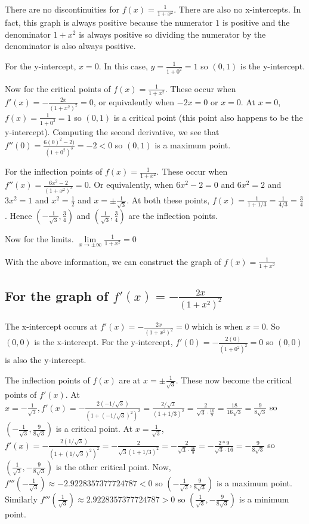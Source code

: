 \documentclass[9pt]{article}
\begin{document}
There are no discontinuities for $f(x) = \frac{1}{1 + x^2}$. There are also no x-intercepts. In fact, this graph is always positive because the numerator $1$ is positive and the denominator $1 + x^2$ is always positive so dividing the numerator by the denominator is also always positive.

For the y-intercept, $x = 0$. In this case, $y = \frac{1}{1 + 0^2} = 1$ so $(0, 1)$ is the y-intercept.

Now for the critical points of $f(x) = \frac{1}{1 + x^2}$. These occur when $f'(x) = -\frac{2x}{(1 + x^2)^2} = 0$, or equivalently when $-2x = 0$ or $x = 0$. At $x = 0$, $f(x) = \frac{1}{1 + 0^2} = 1$ so $(0, 1)$ is a critical point (this point also happens to be the y-intercept). Computing the second derivative, we see that $f''(0) = \frac{6(0)^2 - 2)}{(1 + 0^2)^3} = -2 < 0$ so $(0, 1)$ is a maximum point.

For the inflection points of $f(x) = \frac{1}{1 + x^2}$. These occur when $f''(x) = \frac{6x^2 - 2}{(1 + x^2)^3} = 0$. Or equivalently, when $6x^2 - 2 = 0$ and $6x^2 = 2$ and $3x^2 = 1$ and $x^2 = \frac{1}{2}$ and $x = \pm \frac{1}{\sqrt{3}}$. At both these points, $f(x) = \frac{1}{1 + 1/3} = \frac{1}{4/3} = \frac{3}{4}$. Hence $(-\frac{1}{\sqrt{3}}, \frac{3}{4})$ and $(\frac{1}{\sqrt{3}}, \frac{3}{4})$ are the inflection points.

Now for the limits. $\lim\limits_{x \rightarrow \pm\infty} \frac{1}{1 + x^2} = 0$

With the above information, we can construct the graph of $f(x) = \frac{1}{1 + x^2}$

\subsection*{For the graph of $f'(x) = -\frac{2x}{(1 + x^2)^2}$}

The x-intercept occurs at $f'(x) = -\frac{2x}{(1 + x^2)^2} = 0$ which is when $x = 0$. So $(0, 0)$ is the x-intercept. For the y-intercept, $f'(0) = -\frac{2(0)}{(1 + 0^2)^2} = 0$ so $(0, 0)$ is also the y-intercept.

The inflection points of $f(x)$ are at $x = \pm\frac{1}{\sqrt{3}}$. These now become the critical points of $f'(x)$. At $x = -\frac{1}{\sqrt{3}}, f'(x) = -\frac{2 (- 1 / \sqrt{3})}{(1 + (- 1 / \sqrt{3})^2)^2} = \frac{2 / \sqrt{3}}{(1 + 1/3)^2} = \frac{2}{\sqrt{3} \cdot \frac{16}{9}} = \frac{18}{16 \sqrt{3}} = \frac{9}{8 \sqrt{3}}$ so $(-\frac{1}{\sqrt{3}}, \frac{9}{8 \sqrt{3}})$ is a critical point. At $x = \frac{1}{\sqrt{3}}$, $f'(x) = -\frac{2 (1 / \sqrt{3})}{(1 + (1 / \sqrt{3})^2)^2} = -\frac{2}{\sqrt{3} (1 + 1/3)^2} = -\frac{2}{\sqrt{3} \cdot \frac{16}{9}} = -\frac{2 * 9}{\sqrt{3} \cdot 16} = -\frac{9}{8 \sqrt{3}}$ so $(\frac{1}{\sqrt{3}}, -\frac{9}{8 \sqrt{3}})$ is the other critical point. Now, $f'''(-\frac{1}{\sqrt{3}}) \approx -2.9228357377724787 < 0$ so $(-\frac{1}{\sqrt{3}}, \frac{9}{8 \sqrt{3}})$ is a maximum point. Similarly $f'''(\frac{1}{\sqrt{3}}) \approx 2.9228357377724787 > 0$ so $(\frac{1}{\sqrt{3}}, -\frac{9}{8 \sqrt{3}})$ is a minimum point.
\end{document}
